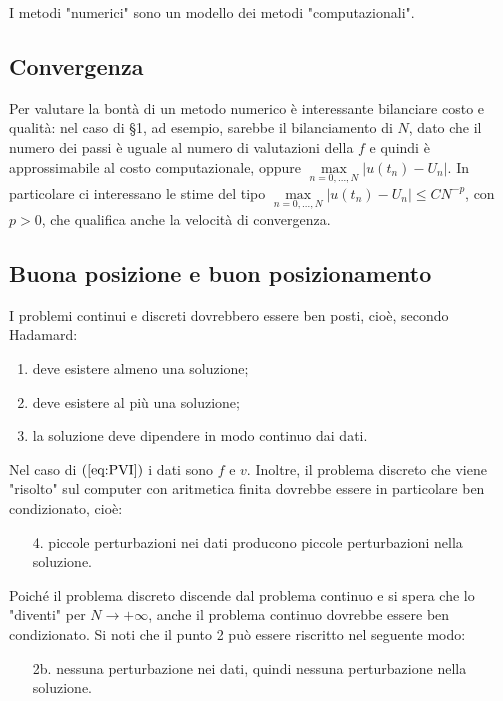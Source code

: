 \documentclass[hidelinks, 10pt]{report}
\begin{document}
I metodi "numerici" sono un modello dei metodi "computazionali".

\subsection{Convergenza}
Per valutare la bont\`a  di un metodo numerico \`e interessante bilanciare costo e qualit\`a: nel caso di \S 1, ad esempio, sarebbe il bilanciamento di $ N $, dato che il numero dei passi \`e uguale al numero di valutazioni della $ f $ e quindi \`e approssimabile al costo computazionale, oppure  $ \max\limits_{n = 0, \dotsc, N} \vert u(t_{n})  - U_{n} \vert $. In particolare ci interessano le stime del tipo $ \max\limits_{n = 0, \dotsc, N} \vert u(t_{n})  - U_{n} \vert \le C N^{-p} $, con $ p > 0 $, che qualifica anche la velocit\`a di convergenza.

\subsection{Buona posizione e buon posizionamento}
I problemi continui e discreti dovrebbero essere ben posti, cio\`e, secondo Hadamard:
\begin{enumerate}
\item deve esistere almeno una soluzione;
\item deve esistere al pi\`u una soluzione;
\item la soluzione deve dipendere in modo continuo dai dati.
\end{enumerate}

Nel caso di $ (\ref{eq:PVI}) $ i dati sono $ f $ e $ v $. Inoltre, il problema discreto che viene "risolto" sul computer con aritmetica finita dovrebbe essere in particolare ben condizionato, cio\`e:
\begin{enumerate}
\item[4.] piccole perturbazioni nei dati producono piccole perturbazioni nella soluzione.
\end{enumerate}

Poich\'e il problema discreto discende dal problema continuo e si spera che lo "diventi" per $ N \to +\infty $, anche il problema continuo dovrebbe essere ben condizionato. Si noti che il punto 2 pu\`o essere riscritto nel seguente modo:
\begin{enumerate}
\item[2b.] nessuna perturbazione nei dati, quindi nessuna perturbazione nella soluzione.  
\end{enumerate}
\end{document}
